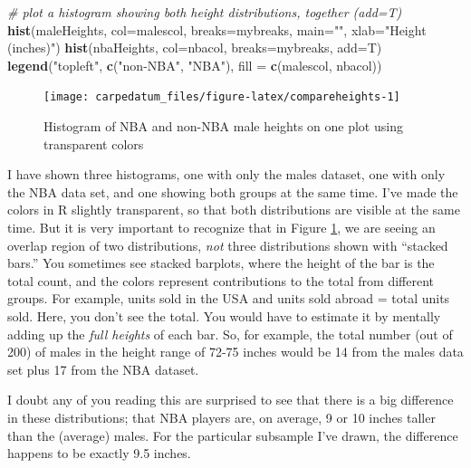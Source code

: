 \documentclass[openany]{book}
\newenvironment{Shaded}{\begin{snugshade}}{\end{snugshade}}
\newcommand{\CommentTok}[1]{\textcolor[rgb]{0.56,0.35,0.01}{\textit{#1}}}
\newcommand{\DataTypeTok}[1]{\textcolor[rgb]{0.13,0.29,0.53}{#1}}
\newcommand{\KeywordTok}[1]{\textcolor[rgb]{0.13,0.29,0.53}{\textbf{#1}}}
\newcommand{\NormalTok}[1]{#1}
\newcommand{\StringTok}[1]{\textcolor[rgb]{0.31,0.60,0.02}{#1}}
\begin{document}
\begin{Shaded}
\begin{Highlighting}[]
\CommentTok{# plot a histogram showing both height distributions, together (add=T)}
\KeywordTok{hist}\NormalTok{(maleHeights, }\DataTypeTok{col=}\NormalTok{malescol, }\DataTypeTok{breaks=}\NormalTok{mybreaks, }
          \DataTypeTok{main=}\StringTok{""}\NormalTok{, }\DataTypeTok{xlab=}\StringTok{"Height (inches)"}\NormalTok{)}
\KeywordTok{hist}\NormalTok{(nbaHeights, }\DataTypeTok{col=}\NormalTok{nbacol, }\DataTypeTok{breaks=}\NormalTok{mybreaks, }\DataTypeTok{add=}\NormalTok{T)}
\KeywordTok{legend}\NormalTok{(}\StringTok{"topleft"}\NormalTok{, }\KeywordTok{c}\NormalTok{(}\StringTok{"non-NBA"}\NormalTok{, }\StringTok{"NBA"}\NormalTok{), }\DataTypeTok{fill =} \KeywordTok{c}\NormalTok{(malescol, nbacol))}
\end{Highlighting}
\end{Shaded}

\begin{figure}

{\centering \texttt{[image: carpedatum\_files/figure-latex/compareheights-1]} 

}

\caption{Histogram of NBA and non-NBA male heights on one plot using transparent colors}\label{fig:compareheights}
\end{figure}

I have shown three histograms, one with only the males dataset, one with only the NBA data set, and one showing both groups at the same time. I've made the colors in R slightly transparent, so that both distributions are visible at the same time. But it is very important to recognize that in Figure \ref{fig:compareheights}, we are seeing an overlap region of two distributions, \emph{not} three distributions shown with ``stacked bars.'' You sometimes see stacked barplots, where the height of the bar is the total count, and the colors represent contributions to the total from different groups. For example, units sold in the USA and units sold abroad = total units sold. Here, you don't see the total. You would have to estimate it by mentally adding up the \emph{full heights} of each bar. So, for example, the total number (out of 200) of males in the height range of 72-75 inches would be 14 from the males data set plus 17 from the NBA dataset.

I doubt any of you reading this are surprised to see that there is a big difference in these distributions; that NBA players are, on average, 9 or 10 inches taller than the (average) males. For the particular subsample I've drawn, the difference happens to be exactly 9.5 inches.
\end{document}
